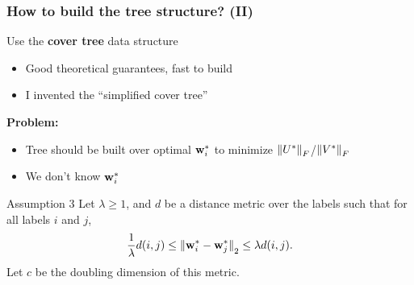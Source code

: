 \begin{frame}
\frametitle{How to build the tree structure? (II)}

Use the \textbf{cover tree} data structure
\begin{itemize}
\item Good theoretical guarantees, fast to build
\pause
\item I invented the ``simplified cover tree'' \citep{izbicki2015faster}
\end{itemize}



\pause
\vspace{0.1in}
\textbf{Problem:}
\begin{itemize}
\item Tree should be built over optimal $\mathbf w_i^*$ to minimize ${\lVert {U^*} \rVert}_F$/${\lVert {V^*} \rVert}_F$
\item We don't know $\mathbf w_i^*$
\end{itemize}

\pause
\vspace{0.1in}
\begin{block}{Assumption 3}
    \label{ass:metric}
    Let $\lambda \ge 1$, and $d$ be a distance metric over the labels such that for all labels $i$ and $j$,
\begin{equation}
    \frac 1 \lambda d(i,j)
    \le {\lVert {{\mathbf w}^{*}_i - {\mathbf w}^{*}_j} \rVert}_2
    \le \lambda d(i, j).
\end{equation}
Let $c$ be the doubling dimension of this metric.
\end{block}

\end{frame}




